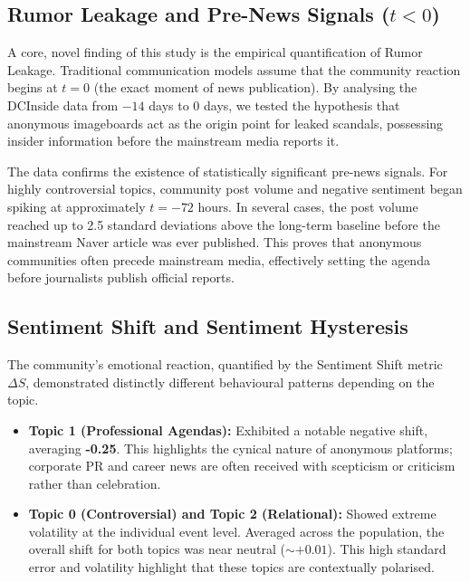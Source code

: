 \documentclass[9pt,twoside,lineno]{pnas-new}
\begin{document}
\begin{article}
\subsection*{Rumor Leakage and Pre-News Signals ($t < 0$)}
A core, novel finding of this study is the empirical quantification of Rumor Leakage. Traditional communication models assume that the community reaction begins at $t=0$ (the exact moment of news publication). By analysing the DCInside data from $-14$ days to $0$ days, we tested the hypothesis that anonymous imageboards act as the origin point for leaked scandals, possessing insider information before the mainstream media reports it.

The data confirms the existence of statistically significant pre-news signals. For highly controversial topics, community post volume and negative sentiment began spiking at approximately $t = -72 \text{ hours}$. In several cases, the post volume reached up to 2.5 standard deviations above the long-term baseline before the mainstream Naver article was ever published. This proves that anonymous communities often precede mainstream media, effectively setting the agenda before journalists publish official reports.

\subsection*{Sentiment Shift and Sentiment Hysteresis}
The community's emotional reaction, quantified by the Sentiment Shift metric $\Delta S$, demonstrated distinctly different behavioural patterns depending on the topic.

\begin{itemize}
    \item \textbf{Topic 1 (Professional Agendas):} Exhibited a notable negative shift, averaging \textbf{-0.25}. This highlights the cynical nature of anonymous platforms; corporate PR and career news are often received with scepticism or criticism rather than celebration.
    \item \textbf{Topic 0 (Controversial) and Topic 2 (Relational):} Showed extreme volatility at the individual event level. Averaged across the population, the overall shift for both topics was near neutral ($\sim +0.01$). This high standard error and volatility highlight that these topics are contextually polarised.
\end{itemize}


\end{article}
\end{document}
